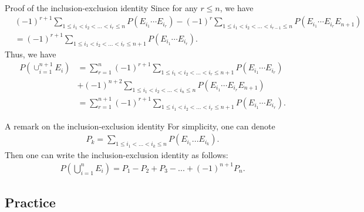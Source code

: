 \begin{frame}{Proof of the inclusion-exclusion identity}
	Since for any $r\leq n$, we have
	\begin{align*}
		&(-1)^{r+1}\sum_{1\leq i_1<i_2<...<i_r\leq n}P(E_{i_1}\cdots E_{i_r})- (-1)^{r}\sum_{1\leq i_1<i_2<...<i_{r-1}\leq n}P(E_{i_1}\cdots E_{i_r}E_{n+1})\\
		&=(-1)^{r+1}\sum_{1\leq i_1<i_2<...<i_r\leq n+1}P(E_{i_1}\cdots E_{i_r}).
	\end{align*}
	Thus, we have
	\begin{align*}
		P(\cup_{i=1}^{n+1} E_i)&=\sum_{r=1}^n (-1)^{r+1}\sum_{1\leq i_1<i_2<...<i_r\leq n+1}P(E_{i_1}\cdots E_{i_r})\\
		&+(-1)^{n+2}\sum_{1\leq i_1<i_2<...<i_n\leq n}P(E_{i_1}\cdots E_{i_r}E_{n+1})\\
		&=\sum_{r=1}^{n+1} (-1)^{r+1}\sum_{1\leq i_1<i_2<...<i_r\leq n+1}P(E_{i_1}\cdots E_{i_r}).
	\end{align*}
\end{frame}
\begin{frame}{A remark on the inclusion-exclusion identity}
	For simplicity, one can denote
	\begin{align*}
		P_k=\sum_{1\leq i_1<...<i_k\leq n}P(E_{i_1}...E_{i_k}).
	\end{align*}
	Then one can write the inclusion-exclusion identity as follows:
	\begin{align*}
		P(\bigcup_{i=1}^n E_i)=P_1-P_2+P_3-...+(-1)^{n+1}P_n.
	\end{align*}

\end{frame}

\subsection{Practice}

